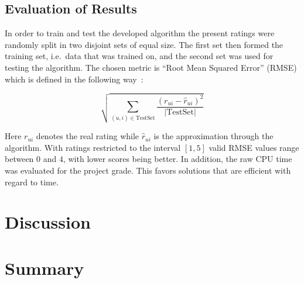 \documentclass[10pt,conference,compsocconf]{IEEEtran}
\newcommand{\abs}[1]{\left\lvert#1\right\rvert}
\begin{document}
\subsection{Evaluation of Results}
\label{sub:evaluation_of_results}

In order to train and test the developed algorithm the present ratings were
randomly split in two disjoint sets of equal size. The first set then formed
the training set, i.e.\ data that was trained on, and the second set was used
for testing the algorithm. The chosen metric is ``Root Mean Squared Error''
(RMSE) which is defined in the following way~\cite{koren2008factorization,
  koren2010factor, koren2011advances}:

\begin{equation}
  \sqrt{\sum_{(u,i) \in \mathrm{TestSet}}
    \frac{{(r_{ui} - \hat{r}_{ui})}^2}{\abs{\mathrm{TestSet}}}}
\end{equation}

Here $r_{ui}$ denotes the real rating while $\hat{r}_{ui}$ is the approximation
through the algorithm. With ratings restricted to the interval $[1,5]$ valid
RMSE values range between $0$ and $4$, with lower scores being better. In
addition, the raw CPU time was evaluated for the project grade. This favors
solutions that are efficient with regard to time.



\section{Discussion}
\label{sec:discussion}

\section{Summary}
\label{sec:summary}

\renewcommand*{\UrlFont}{\rmfamily}
\printbibliography%
\end{document}

